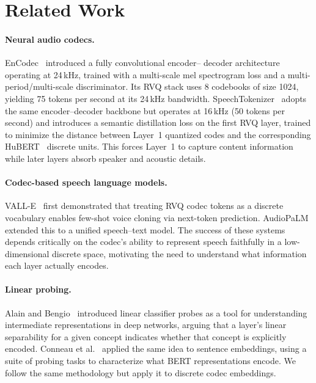 \documentclass[10pt,twocolumn]{article}
\begin{document}
\section{Related Work}

\paragraph{Neural audio codecs.}
EnCodec~\cite{defossez2023} introduced a fully convolutional encoder--
decoder architecture operating at 24\,kHz, trained with a multi-scale
mel spectrogram loss and a multi-period/multi-scale discriminator. Its
RVQ stack uses 8 codebooks of size 1024, yielding 75 tokens per second
at its 24\,kHz bandwidth. SpeechTokenizer~\cite{zhang2024} adopts the
same encoder--decoder backbone but operates at 16\,kHz (50 tokens per
second) and introduces a semantic distillation loss on the first RVQ
layer, trained to minimize the distance between Layer~1 quantized codes
and the corresponding HuBERT~\cite{hsu2021} discrete units. This forces
Layer~1 to capture content information while later layers absorb speaker
and acoustic details.

\paragraph{Codec-based speech language models.}
VALL-E~\cite{wang2023} first demonstrated that treating RVQ codec
tokens as a discrete vocabulary enables few-shot voice cloning via
next-token prediction. AudioPaLM~\cite{rubenstein2023} extended this to
a unified speech--text model. The success of these systems depends
critically on the codec's ability to represent speech faithfully in
a low-dimensional discrete space, motivating the need to understand
what information each layer actually encodes.

\paragraph{Linear probing.}
Alain and Bengio~\cite{alain2016} introduced linear classifier probes
as a tool for understanding intermediate representations in deep
networks, arguing that a layer's linear separability for a given concept
indicates whether that concept is explicitly encoded. Conneau et
al.~\cite{conneau2018} applied the same idea to sentence embeddings,
using a suite of probing tasks to characterize what BERT representations
encode. We follow the same methodology but apply it to discrete codec
embeddings.
\end{document}
